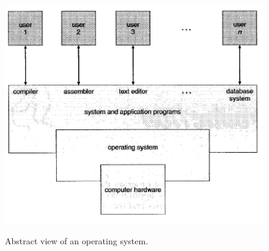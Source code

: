 \documentclass[10pt,a4paper]{article}
\begin{document}
\begin{figure}
\caption{Abstract view of an operating system. \cite{OSCONCEPTS}}
\begin{center}
\includegraphics[scale=0.45]{../images/operating-system.png}
\label{os}
\end{center}
\end{figure}
\end{document}
